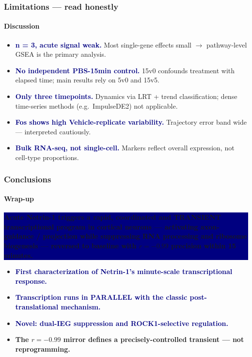 \documentclass[aspectratio=169,11pt]{beamer}
\newcommand{\hi}[1]{\textcolor{navy}{\textbf{#1}}}
\newcommand{\tl}[1]{\textcolor{teald}{\textbf{#1}}}
\begin{document}
\begin{frame}
  \frametitle{Limitations --- read honestly}\framesubtitle{Discussion}
  \small
  \begin{itemize}\setlength\itemsep{5pt}
    \item \hi{n = 3, acute signal weak.} Most single-gene effects small
      $\rightarrow$ pathway-level GSEA is the primary analysis.
    \item \hi{No independent PBS-15min control.} 15v0 confounds treatment with
      elapsed time; main results rely on 5v0 and 15v5.
    \item \hi{Only three timepoints.} Dynamics via LRT + trend classification;
      dense time-series methods (e.g.\ ImpulseDE2) not applicable.
    \item \hi{Fos shows high Vehicle-replicate variability.} Trajectory error band
      wide --- interpreted cautiously.
    \item \hi{Bulk RNA-seq, not single-cell.} Markers reflect overall expression,
      not cell-type proportions.
  \end{itemize}
\end{frame}

\begin{frame}
  \frametitle{Conclusions}\framesubtitle{Wrap-up}
  \colorbox{navy}{\parbox{0.97\textwidth}{\vskip3pt\color{white}\bfseries
    Acute Netrin-1 triggers a rapid, coordinated and TRANSIENT transcriptional
    program in cortical neurons --- activating axon-guidance / projection while
    suppressing RNA processing and ribosome biogenesis --- reversed to baseline
    with $r=-0.99$ precision within 15 minutes.\vskip3pt}}
  \vskip10pt\small
  \begin{itemize}\setlength\itemsep{6pt}
    \item \hi{First characterization of Netrin-1's minute-scale transcriptional response.}
    \item \hi{Transcription runs in PARALLEL with the classic post-translational mechanism.}
    \item \hi{Novel: dual-IEG suppression and ROCK1-selective regulation.}
    \item \tl{The $r=-0.99$ mirror defines a precisely-controlled transient --- not reprogramming.}
  \end{itemize}
\end{frame}
\end{document}
